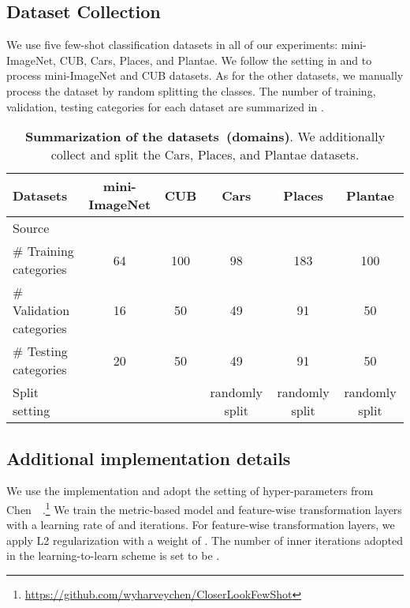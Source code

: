 \subsection{Dataset Collection}
\label{sec:apx1}
We use five few-shot classification datasets in all of our experiments: mini-ImageNet, CUB, Cars, Places, and Plantae.
We follow the setting in \citet{ravi2017metalstm} and \citet{hilliard2018few} to process mini-ImageNet and CUB datasets.
As for the other datasets, we manually process the dataset by random splitting the classes.
The number of training, validation, testing categories for each dataset are summarized in .

\begin{table}[h]\tiny
\centering
\caption{\textbf{Summarization of the datasets~(domains)}. We additionally collect and split the Cars, Places, and Plantae datasets.}
\label{tab:datasets}
\begin{tabular}{l ccccc}
  \toprule
  Datasets & mini-ImageNet & CUB & Cars & Places & Plantae \\
  \midrule
  Source & \citet{deng2009imagenet} & \citet{WelinderEtal2010cub} & \citet{KrauseStarkDengFei-Fei_3DRR2013} & \citet{zhou2017places} & \citet{van2018inaturalist} \\ 
  \# Training categories & 64 & 100 & 98 & 183 & 100 \\
  \# Validation categories & 16 & 50 & 49 & 91 & 50 \\
  \# Testing categories & 20 & 50 & 49 & 91 & 50 \\
  Split setting & \citet{ravi2017metalstm} & \citet{hilliard2018few} & randomly split & randomly split & randomly split \\
  \bottomrule
\end{tabular}
\end{table}

\subsection{Additional implementation details}
\label{sec:apx2}
We use the implementation and adopt the setting of hyper-parameters from Chen~\etal~\citep{chen2019closerfewshot}.\footnote{\url{https://github.com/wyharveychen/CloserLookFewShot}}
We train the metric-based model and feature-wise transformation layers with a learning rate of  and  iterations.
For feature-wise transformation layers, we apply L2 regularization with a weight of .
The number of inner iterations adopted in the learning-to-learn scheme is set to be .

